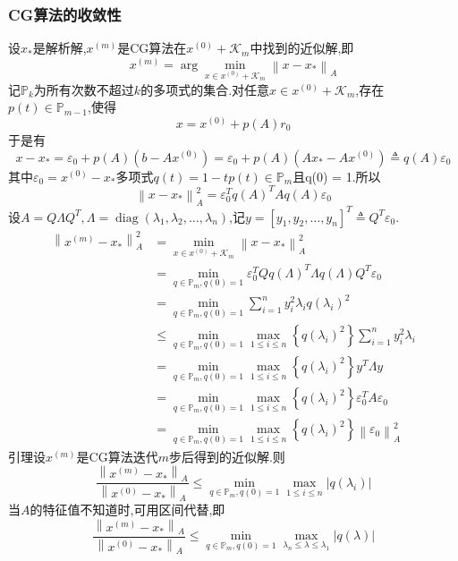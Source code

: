 \documentclass[12pt,a4paper]{article}
\begin{document}
\subsubsection*{CG算法的收敛性}
设$x_{*}$是解析解,$x^{(m)}$是CG算法在$x^{(0)}+\mathcal{K}_{m}$中找到的近似解,即
$$
x^{(m)}=\arg \min _{x \in x^{(0)}+\mathcal{K}_{m}}\left\|x-x_{*}\right\|_{A}
$$
记$\mathbb{P}_{k}$为所有次数不超过$k$的多项式的集合.对任意$x \in x^{(0)}+\mathcal{K}_{m}$,存在$p(t) \in \mathbb{P}_{m-1}$,使得
$$
x=x^{(0)}+p(A) r_{0}
$$
于是有
$$
x-x_{*}=\varepsilon_{0}+p(A)\left(b-A x^{(0)}\right)=\varepsilon_{0}+p(A)\left(A x_{*}-A x^{(0)}\right) \triangleq q(A) \varepsilon_{0}
$$
其中$\varepsilon_{0}=x^{(0)}-x_{*}$多项式$q(t)=1-t p(t) \in \mathbb{P}_{m}$且q(0) = 1.所以
$$
\left\|x-x_{*}\right\|_{A}^{2}=\varepsilon_{0}^{T} q(A)^{T} A q(A) \varepsilon_{0}
$$
设$A=Q \Lambda Q^{T}, \Lambda=\operatorname{diag}\left(\lambda_{1}, \lambda_{2}, \ldots, \lambda_{n}\right)$,记$y=\left[y_{1}, y_{2}, \ldots, y_{n}\right]^{T} \triangleq Q^{T} \varepsilon_{0}$.
$$
\begin{aligned}
\left\|x^{(m)}-x_{*}\right\|_{A}^{2} &=\min _{x \in x^{(0)}+\mathcal{K}_{m}}\left\|x-x_{*}\right\|_{A}^{2} \\ 
&=\min _{q \in \mathbb{P}_{m}, q(0)=1} \varepsilon_{0}^{T} Q q(\Lambda)^{T} \Lambda q(\Lambda) Q^{T} \varepsilon_{0} \\ 
&=\min _{q \in \mathbb{P}_{m}, q(0)=1} \sum_{i=1}^{n} y_{i}^{2} \lambda_{i} q\left(\lambda_{i}\right)^{2}\\
&\leq \min _{q \in \mathbb{P}_{m}, q(0)=1} \max _{1 \leq i \leq n}\left\{q\left(\lambda_{i}\right)^{2}\right\} \sum_{i=1}^{n} y_{i}^{2} \lambda_{i}\\
&=\min _{q \in \mathbb{P}_{m}, q(0)=1} \max _{1 \leq i \leq n}\left\{q\left(\lambda_{i}\right)^{2}\right\} y^{T} \Lambda y\\
&=\min _{q \in \mathbb{P}_{m}, q(0)=1} \max _{1 \leq i \leq n}\left\{q\left(\lambda_{i}\right)^{2}\right\} \varepsilon_{0}^{T} A \varepsilon_{0}\\
&=\min _{q \in \mathbb{P}_{m}, q(0)=1} \max _{1 \leq i \leq n}\left\{q\left(\lambda_{i}\right)^{2}\right\}\left\|\varepsilon_{0}\right\|_{A}^{2}
\end{aligned}
$$
{\color{blue}引理}\qquad 设$x^{(m)}$是CG算法迭代$m$步后得到的近似解.则
$$
\frac{\left\|x^{(m)}-x_{*}\right\|_{A}}{\left\|x^{(0)}-x_{*}\right\|_{A}} \leq \min _{q \in \mathbb{P}_{m}, q(0)=1} \max _{1 \leq i \leq n}\left|q\left(\lambda_{i}\right)\right|
$$
当$A$的特征值不知道时,可用区间代替,即
$$
\frac{\left\|x^{(m)}-x_{*}\right\|_{A}}{\left\|x^{(0)}-x_{*}\right\|_{A}} \leq \min _{q \in \mathbb{P}_{m}, q(0)=1} \max _{\lambda_{n} \leq \lambda \leq \lambda_{1}}|q(\lambda)|
$$
\end{document}
